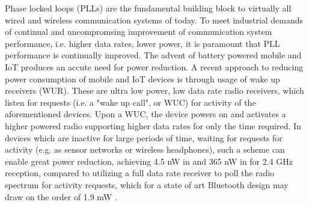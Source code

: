Phase locked loops (PLLs) are the fundamental building block to virtually all wired and wireless communication systems of today. To meet industrial demands of continual and uncompromsing improvement of communication system performance, i.e. higher data rates, lower power, it is paramount that PLL performance is continually improved. The advent of battery powered mobile and IoT produces an accute need for power reduction. A recent approach to reducing power consumption of mobile and IoT devices is through usage of wake up receivers (WUR). These are ultra low power, low data rate radio receivers, which listen for requests (i.e. a "wake up call", or WUC) for activity of the aforementioned devices. Upon a WUC, the device powers on and activates a higher powered radio supporting higher data rates for only the time required. In devices which are inactive for large periods of time, waiting for requests for activity (e.g. as sensor networks or wireless headphones), such a scheme can enable great power reduction, achieving 4.5 nW in \cite{Jiang2017} and 365 nW in \cite{Sadagopan2017} for 2.4 GHz reception, compared to utilizing a full data rate receiver to poll the radio spectrum for activity requests, which for a state of art Bluetooth design may draw on the order of 1.9 mW \cite{Tamura2020}.

